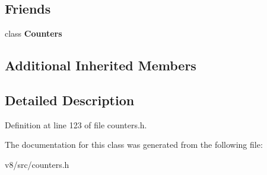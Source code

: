 \subsection*{Friends}
\begin{DoxyCompactItemize}
\item 
\mbox{\label{classv8_1_1internal_1_1StatsCounter_a5545327f141103b96b160ddc48274bc0}} 
class {\bfseries Counters}
\end{DoxyCompactItemize}
\subsection*{Additional Inherited Members}


\subsection{Detailed Description}


Definition at line 123 of file counters.\+h.



The documentation for this class was generated from the following file\+:\begin{DoxyCompactItemize}
\item 
v8/src/counters.\+h\end{DoxyCompactItemize}
